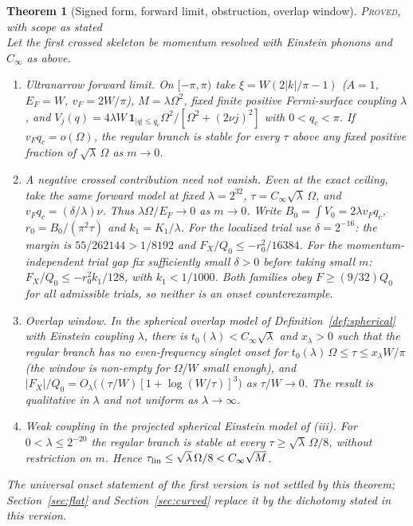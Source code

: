 \documentclass[11pt]{article}
\newcommand{\PROVED}{\upshape\mdseries\textsc{Proved}}
\newcommand{\Cinf}{C_\infty}
\newtheorem{theorem}{Theorem}[section]
\theoremstyle{definition}
\theoremstyle{remark}
\begin{document}
\begin{theorem}[Signed form, forward limit, obstruction, overlap window]\label{thm:V2}\hfill\PROVED, with scope as stated\\
Let the first crossed skeleton be momentum resolved with Einstein phonons and $\Cinf$ as above.
\begin{enumerate}
\item[(i)] \emph{Ultranarrow forward limit.} On $[-\pi,\pi)$ take $\xi=W(2|k|/\pi-1)$ ($A=1$, $E_F=W$, $v_F=2W/\pi$), $M=\lambda\Omega^2$, fixed finite positive Fermi-surface coupling $\lambda$, and $V_j(q)=4\lambda W\,\mathbf1_{|q|\le q_c}\Omega^2/[\Omega^2+(2\nu j)^2]$ with $0<q_c<\pi$. If $v_Fq_c=o(\Omega)$, the regular branch is stable for every $\tau$ above any fixed positive fraction of $\sqrt\lambda\,\Omega$ as $m\to0$.
\item[(ii)] \emph{A negative crossed contribution need not vanish.} Even at the exact ceiling, take the same forward model at fixed $\lambda=2^{32}$, $\tau=\Cinf\sqrt\lambda\,\Omega$, and $v_Fq_c=(\delta/\lambda)\nu$. Thus $\lambda\Omega/E_F\to0$ as $m\to0$. Write $B_0=\int V_0=2\lambda v_Fq_c$, $r_0=B_0/(\pi^2\tau)$ and $k_1=K_1/\lambda$. For the localized trial use $\delta=2^{-16}$: the margin is $55/262144>1/8192$ and $F_X/Q_0\le-r_0^2/16384$. For the momentum-independent trial gap fix sufficiently small $\delta>0$ before taking small $m$: $F_X/Q_0\le-r_0^2k_1/128$, with $k_1<1/1000$. Both families obey $F\ge(9/32)Q_0$ for all admissible trials, so neither is an onset counterexample.
\item[(iii)] \emph{Overlap window.} In the spherical overlap model of Definition~\ref{def:spherical} with Einstein coupling $\lambda$, there is $t_0(\lambda)<\Cinf\sqrt\lambda$ and $x_\lambda>0$ such that the regular branch has no even-frequency singlet onset for $t_0(\lambda)\,\Omega\le\tau\le x_\lambda W/\pi$ (the window is non-empty for $\Omega/W$ small enough), and $|F_X|/Q_0=O_\lambda\big((\tau/W)[1+\log(W/\tau)]^3\big)$ as $\tau/W\to0$. The result is qualitative in $\lambda$ and not uniform as $\lambda\to\infty$.
\item[(iv)] \emph{Weak coupling in the projected spherical Einstein model of (iii).} For $0<\lambda\le2^{-20}$ the regular branch is stable at every $\tau\ge\sqrt\lambda\,\Omega/8$, without restriction on $m$. Hence $\tau_{\rm lin}\le\sqrt\lambda\,\Omega/8<\Cinf\sqrt M$.
\end{enumerate}
The universal onset statement of the first version is not settled by this theorem; Section~\ref{sec:flat} and Section~\ref{sec:curved} replace it by the dichotomy stated in this version.
\end{theorem}
\end{document}

